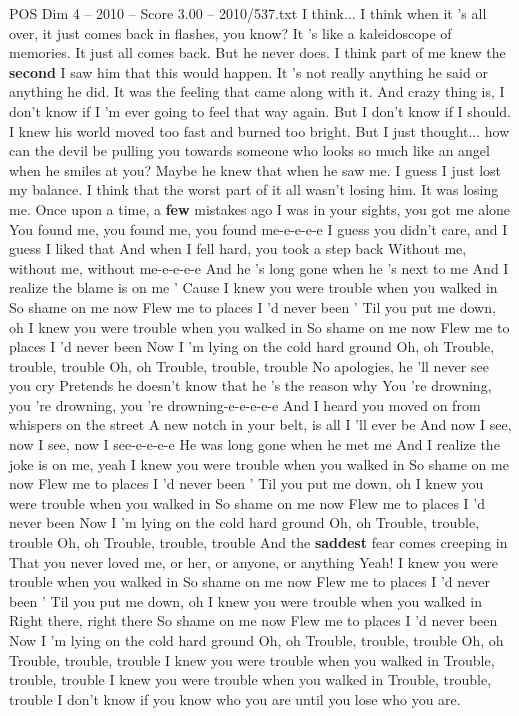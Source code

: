 \begin{textsample}{POS Dim 4 – 2010 – Score 3.00 – 2010/537.txt}  \label{ex:f4_pos_032}
I think...
I think when it 's all over, it just comes back in flashes, you know?
It 's like a kaleidoscope of memories.
It just all comes back.
But he never does.
I think part of me knew the \textbf{second} I saw him that this would happen.
It 's not really anything he said or anything he did.
It was the feeling that came along with it.
And crazy thing is, I don't know if I 'm ever going to feel that way again.
But I don't know if I should.
I knew his world moved too fast and burned too bright.
But I just thought... how can the devil be pulling you towards someone who looks so much like an angel when he smiles at you?
Maybe he knew that when he saw me.
I guess I just lost my balance.
I think that the worst part of it all wasn't losing him.
It was losing me.
Once upon a time, a \textbf{few} mistakes ago I was in your sights, you got me alone You found me, you found me, you found me-e-e-e-e I guess you didn't care, and I guess I liked that And when I fell hard, you took a step back Without me, without me, without me-e-e-e-e And he 's long gone when he 's next to me And I realize the blame is on me ' Cause I knew you were trouble when you walked in So shame on me now Flew me to places I 'd never been ' Til you put me down, oh I knew you were trouble when you walked in So shame on me now Flew me to places I 'd never been Now I 'm lying on the cold hard ground Oh, oh Trouble, trouble, trouble Oh, oh Trouble, trouble, trouble No apologies, he 'll never see you cry Pretends he doesn't know that he 's the reason why You 're drowning, you 're drowning, you 're drowning-e-e-e-e-e And I heard you moved on from whispers on the street A new notch in your belt, is all I 'll ever be And now I see, now I see, now I see-e-e-e-e He was long gone when he met me And I realize the joke is on me, yeah I knew you were trouble when you walked in So shame on me now Flew me to places I 'd never been ' Til you put me down, oh I knew you were trouble when you walked in So shame on me now Flew me to places I 'd never been Now I 'm lying on the cold hard ground Oh, oh Trouble, trouble, trouble Oh, oh Trouble, trouble, trouble And the \textbf{saddest} fear comes creeping in That you never loved me, or her, or anyone, or anything Yeah!
I knew you were trouble when you walked in So shame on me now Flew me to places I 'd never been ' Til you put me down, oh I knew you were trouble when you walked in Right there, right there So shame on me now Flew me to places I 'd never been Now I 'm lying on the cold hard ground Oh, oh Trouble, trouble, trouble Oh, oh Trouble, trouble, trouble I knew you were trouble when you walked in Trouble, trouble, trouble I knew you were trouble when you walked in Trouble, trouble, trouble I don't know if you know who you are until you lose who you are.

\end{textsample}

